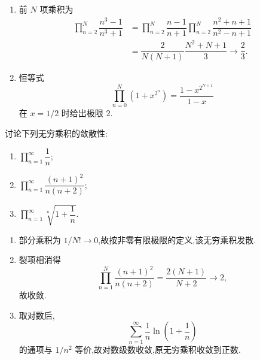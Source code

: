 \begin{solution}
    \leavevmode
    \begin{enumerate}
        \item 前 $N$ 项乘积为
              \[
                  \begin{aligned}
                      \prod\limits_{n=2}^{N}\dfrac{n^3-1}{n^3+1}
                       & =\prod\limits_{n=2}^{N}\dfrac{n-1}{n+1}
                      \prod\limits_{n=2}^{N}\dfrac{n^2+n+1}{n^2-n+1} \\
                       & =\dfrac{2}{N(N+1)}\dfrac{N^2+N+1}{3}
                      \longrightarrow\dfrac{2}{3}.
                  \end{aligned}
              \]
        \item 恒等式
              \[
                  \displaystyle\prod\limits_{n=0}^{N}(1+x^{2^n})=\dfrac{1-x^{2^{N+1}}}{1-x}
              \]
              在 $x=1/2$ 时给出极限 $2$.
    \end{enumerate}
\end{solution}

\begin{example}
    讨论下列无穷乘积的敛散性:
    \begin{enumerate}
        \item $\displaystyle\prod\limits_{n=1}^{\infty}\dfrac{1}{n}$;
        \item $\displaystyle\prod\limits_{n=1}^{\infty}\dfrac{(n+1)^2}{n(n+2)}$;
        \item $\displaystyle\prod\limits_{n=1}^{\infty}\sqrt[n]{1+\dfrac{1}{n}}$.
    \end{enumerate}
\end{example}
\exampleblank

\begin{solution}
    \leavevmode
    \begin{enumerate}
        \item 部分乘积为 $1/N!\to0$,故按非零有限极限的定义,该无穷乘积发散.
        \item 裂项相消得
              \[
                  \displaystyle\prod\limits_{n=1}^{N}\dfrac{(n+1)^2}{n(n+2)}
                  =\dfrac{2(N+1)}{N+2}\longrightarrow2,
              \]
              故收敛.
        \item 取对数后,
              \[
                  \displaystyle\sum\limits_{n=1}^{\infty}\dfrac{1}{n}\ln\left(1+\dfrac{1}{n}\right)
              \]
              的通项与 $1/n^2$ 等价,故对数级数收敛,原无穷乘积收敛到正数.
    \end{enumerate}
\end{solution}

